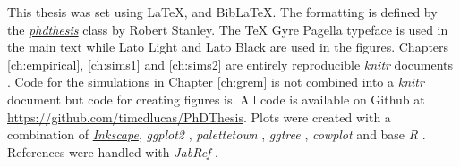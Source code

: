 This thesis was set using \LaTeX, \XeLaTeX\vspace{1mm} and Bib\LaTeX. \vspace{-0.12cm} 
The formatting is defined by the \href{https://github.com/robjstan/latex-phdthesis}{\emph{phdthesis}} class by Robert Stanley.
The TeX Gyre Pagella typeface is used in the main text while { Lato Light} and { \color[rgb]{0.75,0.75,0.75} Lato Black} are used in the figures.
Chapters \ref{ch:empirical}, \ref{ch:sims1} and \ref{ch:sims2} are entirely reproducible \href{http://yihui.name/knitr/}{\emph{knitr}} documents \cite{knitr}.
Code for the simulations in Chapter \ref{ch:grem} is not combined into a \emph{knitr} document but code for creating figures is.
All code is available on Github at \url{https://github.com/timcdlucas/PhDThesis}. %
Plots were created with a combination of \href{www.inkscape.org}{\emph{Inkscape}}, \emph{ggplot2} \cite{ggplot2}, \emph{palettetown} \cite{palettetown}, \emph{ggtree} \cite{ggtree}, \emph{cowplot} \cite{cowplot} and base \emph{R} \cite{R}.
References were handled with \emph{JabRef} \cite{JabRef_software}. 


